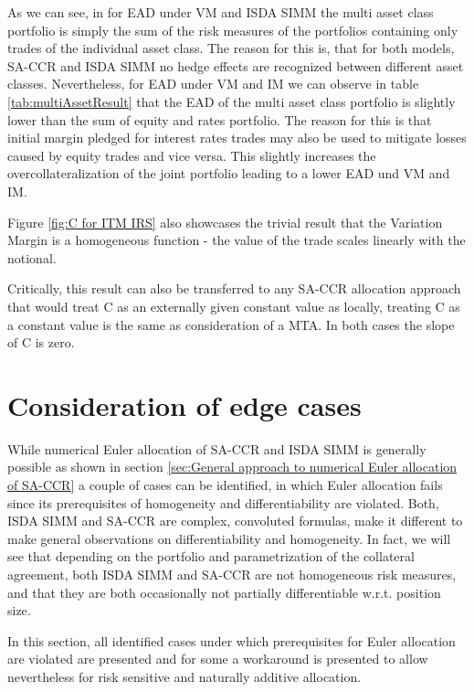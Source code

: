 \documentclass[../Thesis_AHoecherl.tex]{subfiles}
\begin{document}
    As we can see, in for EAD under VM and ISDA SIMM the multi asset class portfolio is simply the sum of the risk measures of the portfolios containing only trades of the individual asset class.
    The reason for this is, that for both models, SA-CCR and ISDA SIMM no hedge effects are recognized between different asset classes.
    Nevertheless, for EAD under VM and IM we can observe in table \ref{tab:multiAssetResult} that the EAD of the multi asset class portfolio is slightly lower than the sum of equity and rates portfolio. 
    The reason for this is that initial margin pledged for interest rates trades may also be used to mitigate losses caused by equity trades and vice versa. This slightly increases the overcollateralization of the joint portfolio leading to a lower EAD und VM and IM. 

    Figure \ref{fig:C for ITM IRS} also showcases the trivial result that the Variation Margin is a homogeneous function - the value of the trade scales linearly with the notional.
    
    Critically, this result can also be transferred to any SA-CCR allocation approach that would treat C as an externally given constant value as locally, treating C as a constant value is the same as consideration of a \gls{MTA}. 
    In both cases the slope of C is zero.  

    \section{Consideration of edge cases\label{sec:Consideration of edge cases}}

    While numerical Euler allocation of SA-CCR and ISDA SIMM is generally possible as shown in section \ref{sec:General approach to numerical Euler allocation of SA-CCR} a couple of cases can be identified, in which Euler allocation fails since its prerequisites of homogeneity and differentiability are violated.
    Both, ISDA SIMM and SA-CCR are complex, convoluted formulas, make it different to make general observations on differentiability and homogeneity.
    In fact, we will see that depending on the portfolio and parametrization of the collateral agreement, both ISDA SIMM and SA-CCR are not homogeneous risk measures, and that they are both occasionally not partially differentiable w.r.t. position size.
    
    In this section, all identified cases under which prerequisites for Euler allocation are violated are presented and for some a workaround is presented to allow nevertheless for risk sensitive and naturally additive allocation.
    
\end{document}
